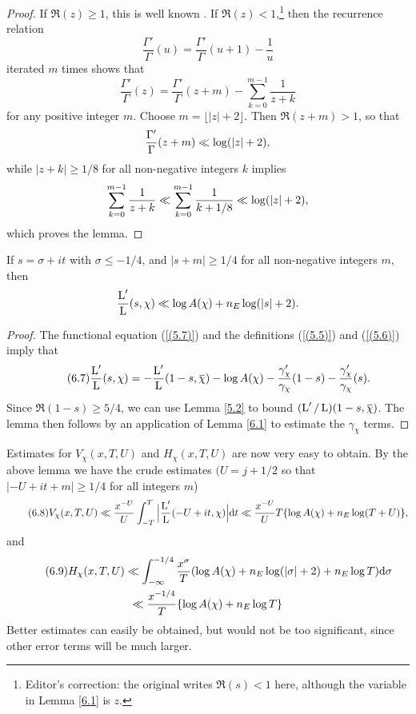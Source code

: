 \documentclass[./main]{subfiles}
\begin{document}
\begin{proof}
If $\Re(z) \geq 1$, this is well known \cite[p.251]{17-whittaker1996course}. If $\Re(z) < 1$,\footnote{Editor's correction: the original writes $\Re(s)<1$ here, although the variable in Lemma \ref{6.1} is $z$.} then the recurrence relation 
\[\frac{\Gamma'}{\Gamma}(u) = \frac{\Gamma'}{\Gamma}(u+1) - \frac{1}{u}
\]
iterated $m$ times shows that
\[\frac{\Gamma'}{\Gamma}(z) = \frac{\Gamma'}{\Gamma}(z+m) - \sum_{k=0}^{m-1} \frac{1}{z+k}
\]
for any positive integer $m$. Choose $m = \lfloor|z| + 2\rfloor$. Then $\Re(z+m)>1$, so that 
\[\frac{\Gamma'}{\Gamma}(z+m) \ll \log(|z|+2),
\]
while $|z+k| \geq 1/8$ for all non-negative integers $k$ implies 
\[\sum_{k=0}^{m-1} \frac{1}{z+k} \ll \sum_{k=0}^{m-1} \frac{1}{k+1/8} \ll \log(|z| + 2)
,\]
which proves the lemma.
\end{proof}
\begin{lemma} \label{6.2}
If $s = \sigma + it$ with $\sigma \leq -1/4$, and $|s+m| \geq 1/4$ for all non-negative integers $m$, then 
\[\frac{\operatorname{L}'}{\operatorname{L}}(s, \chi) \ll \log A(\chi) + n_E \log(|s| + 2).
\]
\end{lemma}
\begin{proof}
The functional equation (\ref{(5.7)}) and the definitions (\ref{(5.5)}) and (\ref{(5.6)}) imply that
\[\tag{6.7}\label{(6.7)}\frac{\L'}{\L}(s, \chi) = -\frac{\L'}{\L}(1-s, \xoverline{\chi}) - \log A(\chi) - \frac{\gamma'_{\chi}}{\gamma_{\chi}} (1-s) - \frac{\gamma'_{\chi}}{\gamma_{\chi}}(s).
\]
Since $\Re(1-s) \geq 5/4$, we can use Lemma \ref{5.2} to bound $(\L'/\L)(1-s, \xoverline{\chi})$. The lemma then follows by an application of Lemma \ref{6.1} to estimate the $\gamma_{\chi}$ terms.
\end{proof}
Estimates for $V_{\chi}(x,T,U)$ and $H_{\chi}(x,T,U)$ are now very easy to obtain. By the above lemma we have the crude estimates $(U = j + 1/2$ so that $|-U + it+m| \geq 1/4$ for all integers $m$)
\[\tag{6.8}\label{(6.8)}  V_{\chi}(x,T,U) \ll \frac{x^{-U}}{U} \int_{-T}^{T} \Big| \frac{\operatorname{L}'}{\operatorname{L}}(-U+it, \chi) \Big| \mathrm{d}{t} \ll \frac{x^{-U}}{U} T\{\log A(\chi) + n_E \log(T+U)\},
\]
and 
\begin{multline}\tag{6.9}\label{(6.9)}
H_{\chi}(x,T,U) \ll \int_{-\infty}^{-1/4} \frac{x^{\sigma}}{T}(\log A(\chi) + n_E \log(|\sigma| + 2) + n_E \log T ) \mathrm{d}{\sigma}\\
\ll \frac{x^{-1/4}}{T} \{\log A(\chi) + n_E \log T\}
\end{multline}
Better estimates can easily be obtained, but would not be too significant, since other error terms will be much larger.
\end{document}
